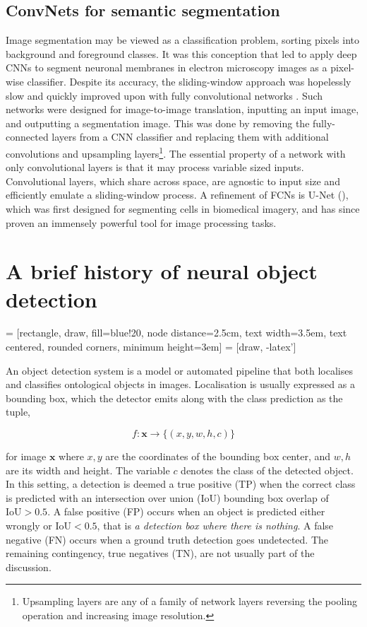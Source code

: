 \subsection{ConvNets for semantic segmentation}

Image segmentation may be viewed as a classification problem, sorting pixels into background and foreground classes. It was this conception that led \cite{ciresan2012deep} to apply deep CNNs to segment neuronal membranes in electron microscopy images as a pixel-wise classifier. Despite its accuracy, the sliding-window approach was hopelessly slow and quickly improved upon with fully convolutional networks \cite{long2015fully}. Such networks were designed for image-to-image translation, inputting an input image, and outputting a segmentation image. This was done by removing the fully-connected layers from a CNN classifier and replacing them with additional convolutions and upsampling layers\footnote{Upsampling layers are any of a family of network layers reversing the pooling operation and increasing image resolution.}. The essential property of a network with only convolutional layers is that it may process variable sized inputs. Convolutional layers, which share across space, are agnostic to input size and efficiently emulate a sliding-window process. A refinement of FCNs is U-Net (\cite{ronneberger2015u}), which was first designed for segmenting cells in biomedical imagery, and has since proven an immensely powerful tool for image processing tasks.

\section{A brief history of neural object detection}

 = [rectangle, draw, fill=blue!20, node distance=2.5cm,
    text width=3.5em, text centered, rounded corners, minimum height=3em]
 = [draw, -latex']

An object detection system is a model or automated pipeline that both localises and classifies ontological objects in images. Localisation is usually expressed as a bounding box, which the detector emits along with the class prediction as the tuple,

$$f : \mathbf{x} \to \big\{(x, y, w, h, c)\big\}$$

for image $\mathbf{x}$ where $x, y$ are the coordinates of the bounding box center, and $w, h$ are its width and height. The variable $c$ denotes the class of the detected object. In this setting, a detection is deemed a true positive (TP) when the correct class is predicted with an intersection over union (IoU) bounding box overlap of $\text{IoU} > 0.5$. A false positive (FP) occurs when an object is predicted either wrongly or $\text{IoU} < 0.5$, that is \emph{a detection box where there is nothing}. A false negative (FN) occurs when a ground truth detection goes undetected. The remaining contingency, true negatives (TN), are not usually part of the discussion.

